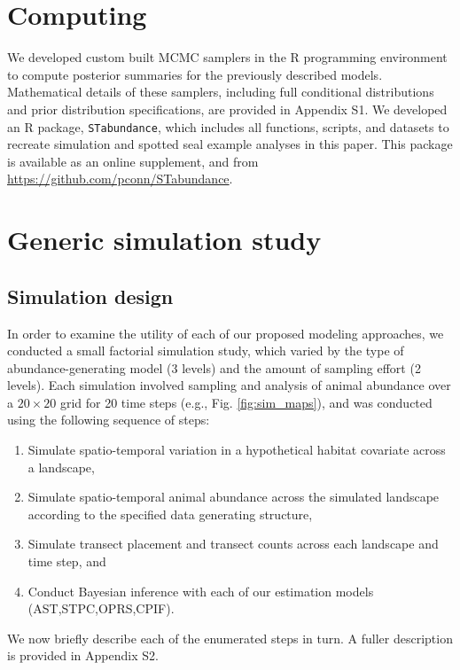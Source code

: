 \documentclass[12pt,english]{article}
\begin{document}
\begin{spacing}{1.9}
\section{Computing}

We developed custom built MCMC samplers in the R programming environment \citep{RTeam2013} to compute posterior summaries for the previously described models.  Mathematical details of these samplers, including full conditional distributions and prior distribution specifications, are provided in Appendix S1.  We developed an R package, \texttt{STabundance}, which includes all functions, scripts, and datasets to recreate simulation and spotted seal example analyses in this paper.  This package is available as an online supplement, and from \url{https://github.com/pconn/STabundance}.

\section{Generic simulation study}

\subsection{Simulation design}

In order to examine the utility of each of our proposed modeling approaches, we conducted a small factorial simulation study, which varied by the type of abundance-generating model (3 levels) and the amount of sampling effort (2 levels).  Each simulation involved sampling and analysis of animal abundance over a $20 \times 20$ grid for 20 time steps (e.g., Fig. \ref{fig:sim_maps}), and was conducted using the following sequence of steps:
\begin{enumerate}
 \item Simulate spatio-temporal variation in a hypothetical habitat covariate across a landscape,
 \item Simulate spatio-temporal animal abundance across the simulated landscape according to the specified data generating structure,
 \item Simulate transect placement and transect counts across each landscape and time step, and
 \item Conduct Bayesian inference with each of our estimation models (AST,STPC,OPRS,CPIF).
\end{enumerate}
We now briefly describe each of the enumerated steps in turn.  A fuller description is provided in Appendix S2.


\end{spacing}
\end{document}
